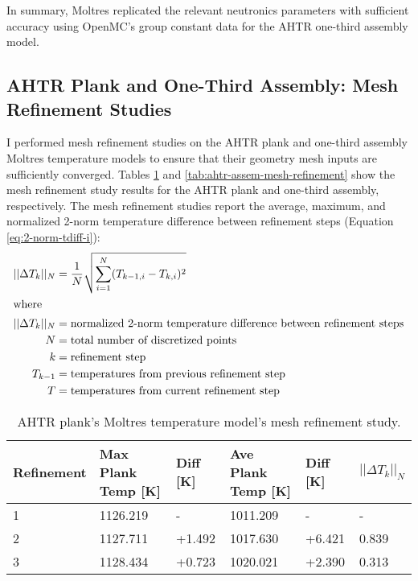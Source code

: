 In summary, Moltres replicated the relevant neutronics parameters with sufficient 
accuracy using OpenMC's group constant data for the \gls{AHTR} one-third assembly 
model. 

\subsection{AHTR Plank and One-Third Assembly: Mesh Refinement Studies}
I performed mesh refinement studies on the \gls{AHTR} plank and one-third assembly 
Moltres temperature models to ensure that their geometry mesh inputs are sufficiently 
converged. 
Tables \ref{tab:ahtr-plank-mesh-refinement} and \ref{tab:ahtr-assem-mesh-refinement}
show the mesh refinement study results for the \gls{AHTR} plank and one-third 
assembly, respectively. 
The mesh refinement studies report the average, maximum, and normalized 2-norm 
temperature difference between refinement steps (Equation \ref{eq:2-norm-tdiff-i}):
\begin{align}
    \label{eq:2-norm-tdiff-i}
    ||\Delta T_k||_N &= \frac{1}{N}\sqrt{\sum_{i=1}^N(T_{k-1, i} - T_{k, i})^2} \\
\intertext{where}
    ||\Delta T_k||_N &= \mbox{normalized 2-norm temperature difference between refinement steps} \nonumber \\
    N &= \mbox{total number of discretized points} \nonumber \\
    k &= \mbox{refinement step} \nonumber \\
    T_{k-1} &= \mbox{temperatures from previous refinement step} \nonumber \\
    T &= \mbox{temperatures from current refinement step} \nonumber 
\end{align} 
\begin{table}[htbp]
    \centering
    \onehalfspacing
    \caption{\acrfull{AHTR} plank's Moltres temperature model's mesh refinement study.}
	\label{tab:ahtr-plank-mesh-refinement}
    \scriptsize
    \begin{tabular}{lp{3.2cm}lp{3.2cm}ll}
        \hline 
        \textbf{Refinement} & \textbf{Max Plank Temp [K]} 
        & \textbf{Diff [K]} & \textbf{Ave Plank Temp [K]}
        & \textbf{Diff [K]} & $||\Delta T_k||_N$\\ 
        \hline 
        1 & 1126.219 & - & 1011.209 & - & - \\
        2 & 1127.711 & +1.492 & 1017.630 & +6.421 & 0.839\\
        3 & 1128.434 & +0.723 & 1020.021 & +2.390 & 0.313\\ 
        \hline
    \end{tabular}
\end{table}
